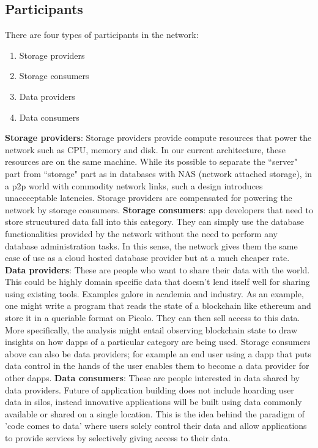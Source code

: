 \subsection{Participants} \label{sec:participants}
There are four types of participants in the network:
\begin{enumerate}
	\item Storage providers
	\item Storage consumers
	\item Data providers
	\item Data consumers \newline
\end{enumerate}
\textbf{Storage providers}: Storage providers provide compute resources that power the network such as CPU, memory and disk. In our current architecture, these resources are on the same machine. While its possible to separate the ``server" part from ``storage" part as in databases with NAS (network attached storage), in a p2p world with commodity network links, such a design introduces unaccceptable latencies. Storage providers are compensated for powering the network by storage consumers. 
\newline\newline
\textbf{Storage consumers}: \DJ app developers that need to store strucutured data fall into this category. They can simply use the database functionalities provided by the network without the need to perform any database administration tasks. In this sense, the network gives them the same ease of use as a cloud hosted database provider but at a much cheaper rate.
\newline\newline
\textbf{Data providers}: These are people who want to share their data with the world. This could be highly domain specific data that doesn't lend itself well for sharing using existing tools. Examples galore in academia and industry. As an example, one might write a program that reads the state of a blockchain like ethereum and store it in a queriable format on Picolo. They can then sell access to this data. More specifically, the analysis might entail observing blockchain state to draw insights on how dapps of a particular category are being used. Storage consumers above can also be data providers; for example an end user using a dapp that puts data control in the hands of the user enables them to become a data provider for other dapps. 
\newline\newline
\textbf{Data consumers}: These are people interested in data shared by data providers. Future of application building does not include hoarding user data in silos, instead innovative applications will be built using data commonly available or shared on a single location. This is the idea behind the paradigm of 'code comes to data' where users solely control their data and allow applications to provide services by selectively giving access to their data.


